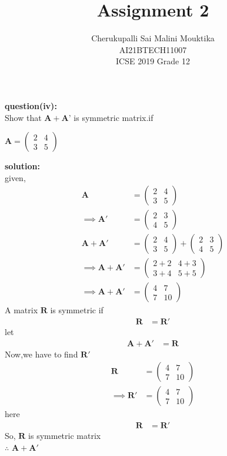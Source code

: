 \documentclass[12pt,two column]{article}
\title{Assignment 2}
\author{ Cherukupalli Sai Malini Mouktika\\\normalsize AI21BTECH11007 \\ \vspace*{10pt} \Large ICSE 2019 Grade 12}
\newcommand{\myvec}[1]{\ensuremath{\begin{pmatrix}#1\end{pmatrix}}}
\let\vec\mathbf
\begin{document}
\maketitle

\textbf{question(iv): }\\
Show that $\vec{A} + \vec{A’}$ is symmetric matrix.if

  $\vec{A} = \myvec{2 &  4 \\ 3 & 5}$

\textbf{solution: }\\
given,
\begin{align}
\vec{A} &= \myvec{2 &  4 \\ 3 & 5}\\
\implies
\vec{A'} &=\myvec{2 &  3 \\ 4 & 5}\\
\vec{A}+\vec{A'} &= \myvec{2 &  4 \\ 3 & 5}+\myvec{2 &  3 \\ 4 & 5}\\
\implies
\vec{A}+\vec{A'} &= \myvec{2+2 &  4+3 \\ 3+4 & 5+5}\\
\implies
\vec{A}+\vec{A'} &= \myvec{4 &  7 \\ 7 & 10}
\end{align}
A matrix  $\vec{R}$ is symmetric if 
\begin{align}
\vec{R} &=\vec{R'}
\end{align}
let
\begin{align}
 \vec{A}+\vec{A'} &= \vec{R}   
\end{align}
Now,we have to find $\vec{R'}$
\begin{align}
\vec{R} &= \myvec{4 &  7 \\ 7 & 10}\\
\implies
\vec{R'}  &= \myvec{4 &  7 \\ 7 & 10}
\end{align}
here 
\begin{align}
\vec{R} &= \vec{R'} 
\end{align}
So, $\vec{R}$ is symmetric matrix\\
$\therefore$ $\vec{A}+\vec{A'}$ 
\end{document}
